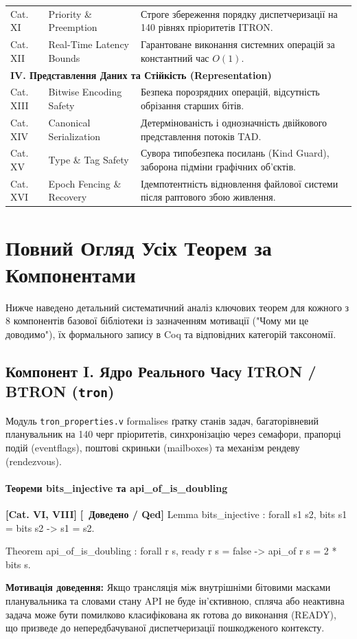 \documentclass{article}
\let\originalfootnotesize\footnotesize
\let\oldverbatim\verbatim
\let\oldendverbatim\endverbatim
\renewenvironment{verbatim}{\originalfootnotesize\oldverbatim}{\oldendverbatim}
\newcommand{\thmcategory}[1]{{\small\textbf{\color{coreblue}[#1]}}}
\newcommand{\thmproven}{{\small\textbf{\color{productgreen}[\checkmark\ Доведено / Qed]}}}
\newcommand{\thmmotivation}[1]{%
  \par\smallskip\noindent\colorbox{boxbg}{\parbox{\dimexpr\linewidth-2\fboxsep\relax}{%
    \small\textbf{Мотивація доведення:} #1%
  }}\par\medskip
}
\begin{document}
\begin{center}
\begin{longtable}{@{}lp{5.2cm}p{6.5cm}@{}}
Cat. XI & Priority \& Preemption & Строге збереження порядку диспетчеризації на 140 рівнях пріоритетів ITRON. \\
Cat. XII & Real-Time Latency Bounds & Гарантоване виконання системних операцій за константний час $O(1)$. \\[4pt]
\multicolumn{3}{l}{\textbf{\color{nato}IV. Представлення Даних та Стійкість (Representation)}}\\[2pt]
Cat. XIII & Bitwise Encoding Safety & Безпека порозрядних операцій, відсутність обрізання старших бітів. \\
Cat. XIV & Canonical Serialization & Детермінованість і однозначність двійкового представлення потоків TAD. \\
Cat. XV & Type \& Tag Safety & Сувора типобезпека посилань (Kind Guard), заборона підміни графічних об'єктів. \\
Cat. XVI & Epoch Fencing \& Recovery & Ідемпотентність відновлення файлової системи після раптового збою живлення. \\
\bottomrule
\end{longtable}
\end{center}

\section{Повний Огляд Усіх Теорем за Компонентами}

Нижче наведено детальний систематичний аналіз ключових теорем для кожного з 8 компонентів базової бібліотеки із зазначенням мотивації ("Чому ми це доводимо"), їх формального запису в Coq та відповідних категорій таксономії.

\subsection[Компонент I. Ядро Реального Часу ITRON]{Компонент I. Ядро Реального Часу ITRON / BTRON (\texttt{tron})}

Модуль \texttt{tron\_properties.v} formalises ґратку станів задач, багаторівневий планувальник на 140 черг пріоритетів, синхронізацію через семафори, прапорці подій (eventflags), поштові скриньки (mailboxes) та механізм рендеву (rendezvous).

\paragraph{Теореми bits\_injective та api\_of\_is\_doubling} \thmcategory{Cat. VI, VIII} \thmproven
\begin{verbatim}
Lemma bits_injective : forall s1 s2, bits s1 = bits s2 -> s1 = s2.

Theorem api_of_is_doubling : forall r s,
  ready r s = false ->
  api_of r s = 2 * bits s.
\end{verbatim}
\thmmotivation{Якщо трансляція між внутрішніми бітовими масками планувальника та словами стану API не буде ін'єктивною, спляча або неактивна задача може бути помилково класифікована як готова до виконання (READY), що призведе до непередбачуваної диспетчеризації пошкодженого контексту.}
\end{document}
